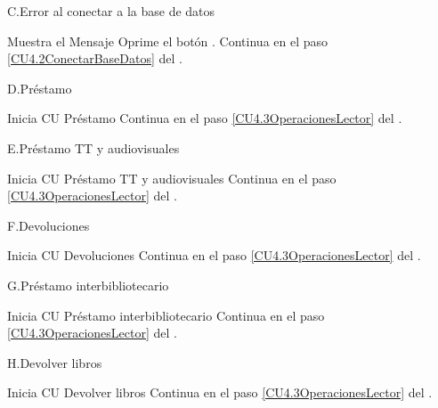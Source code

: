 		\begin{UCtrayectoriaA}{C.}{Error al conectar a la base de datos}

			\UCpaso Muestra el Mensaje 
			\UCpaso[\UCactor] Oprime el botón .
			\UCpaso Continua en el paso \ref{CU4.2ConectarBaseDatos} del .

		\end{UCtrayectoriaA}


		\begin{UCtrayectoriaA}{D.}{Préstamo}

			\UCpaso Inicia CU Préstamo
			\UCpaso Continua en el paso \ref{CU4.3OperacionesLector} del .

		\end{UCtrayectoriaA}

		\begin{UCtrayectoriaA}{E.}{Préstamo TT y audiovisuales}

			\UCpaso Inicia CU Préstamo TT y audiovisuales
			\UCpaso Continua en el paso \ref{CU4.3OperacionesLector} del .

		\end{UCtrayectoriaA}

		\begin{UCtrayectoriaA}{F.}{Devoluciones}

			\UCpaso Inicia CU Devoluciones
			\UCpaso Continua en el paso \ref{CU4.3OperacionesLector} del .

		\end{UCtrayectoriaA}

		\begin{UCtrayectoriaA}{G.}{Préstamo interbibliotecario}

			\UCpaso Inicia CU Préstamo interbibliotecario
			\UCpaso Continua en el paso \ref{CU4.3OperacionesLector} del .

		\end{UCtrayectoriaA}

		\begin{UCtrayectoriaA}{H.}{Devolver libros}

			\UCpaso Inicia CU Devolver libros
			\UCpaso Continua en el paso \ref{CU4.3OperacionesLector} del .

		\end{UCtrayectoriaA}				

